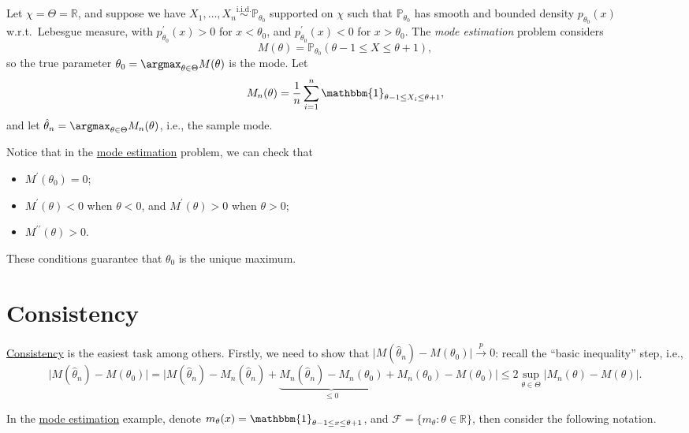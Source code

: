 \begin{eg}\label{eg:mode-estimation}
	Let \(\chi = \Theta = \mathbb{R} \), and suppose we have \(X_1, \dots , X_n \overset{\text{i.i.d.} }{\sim } \mathbb{P} _{\theta _0}\) supported on \(\chi \) such that \(\mathbb{P} _{\theta _0}\) has smooth and bounded density \(p_{\theta _0} (x)\) w.r.t.\ Lebesgue measure, with \(p^{\prime} _{\theta _0} (x) > 0\) for \(x < \theta _0\), and \(p^{\prime} _{\theta _0} (x) < 0\) for \(x > \theta _0\). The \emph{mode estimation} problem considers
	\[
		M(\theta ) = \mathbb{P} _{\theta _0}(\theta -1 \leq X \leq \theta +1),
	\]
	so the true parameter \(\theta _0 = \argmax_{\theta \in \Theta } M(\theta )\) is the mode. Let
	\[
		M_n(\theta ) = \frac{1}{n} \sum_{i=1}^{n} \mathbbm{1}_{\theta -1 \leq X_i \leq \theta +1},
	\]
	and let \(\hat{\theta} _n = \argmax_{\theta \in \Theta } M_n(\theta )\), i.e., the sample mode.
\end{eg}

\begin{remark}
	Notice that in the \hyperref[eg:mode-estimation]{mode estimation} problem, we can check that
	\begin{itemize}
		\item \(M^{\prime} (\theta _0) = 0\);
		\item \(M^{\prime} (\theta ) < 0\) when \(\theta < 0\), and \(M^{\prime} (\theta ) > 0\) when \(\theta > 0\);
		\item \(M^{\prime\prime} (\theta ) > 0\).
	\end{itemize}
	These conditions guarantee that \(\theta _0\) is the unique maximum.
\end{remark}

\section{Consistency}
\hyperref[prb:consistency]{Consistency} is the easiest task among others. Firstly, we need to show that \(\vert M(\hat{\theta} _n) - M(\theta _0) \vert \overset{p}{\to } 0\): recall the ``basic inequality'' step, i.e.,
\[
	\vert M(\hat{\theta} _n) - M(\theta _0) \vert
	= \vert M(\hat{\theta} _n) - M_n(\hat{\theta} _n) + \underbrace{M_n(\hat{\theta} _n) - M_n(\theta _0)}_{\leq 0} + M_n(\theta _0) - M(\theta _0) \vert
	\leq 2 \sup _{\theta \in \Theta } \vert M_n(\theta ) - M(\theta ) \vert.
\]

In the \hyperref[eg:mode-estimation]{mode estimation} example, denote \(m_\theta (x) = \mathbbm{1}_{\theta -1 \leq x \leq \theta +1} \), and \(\mathscr{F} = \{ m_\theta \colon \theta \in \mathbb{R} \} \), then consider the following notation.

